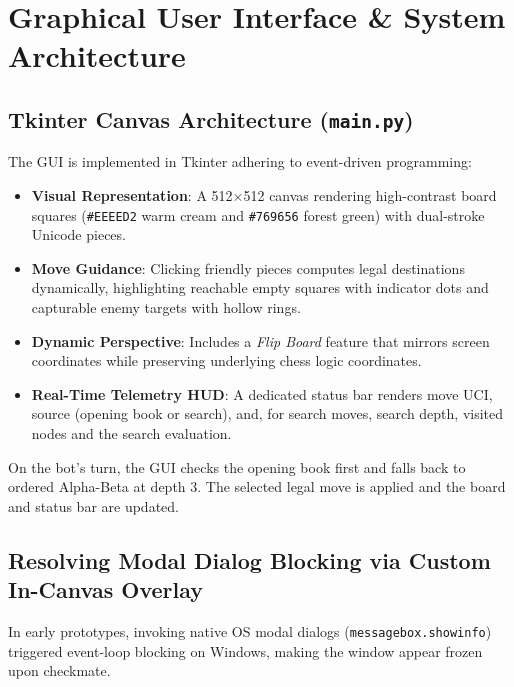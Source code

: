 \documentclass[11pt,a4paper]{article}
\begin{document}
\section{Graphical User Interface \& System Architecture}
\subsection{Tkinter Canvas Architecture (\texttt{main.py})}
The GUI is implemented in Tkinter adhering to event-driven programming:
\begin{itemize}[leftmargin=*]
    \item \textbf{Visual Representation}: A 512$\times$512 canvas rendering high-contrast board squares (\texttt{\#EEEED2} warm cream and \texttt{\#769656} forest green) with dual-stroke Unicode pieces.
    \item \textbf{Move Guidance}: Clicking friendly pieces computes legal destinations dynamically, highlighting reachable empty squares with indicator dots and capturable enemy targets with hollow rings.
    \item \textbf{Dynamic Perspective}: Includes a \textit{Flip Board} feature that mirrors screen coordinates while preserving underlying chess logic coordinates.
    \item \textbf{Real-Time Telemetry HUD}: A dedicated status bar renders move UCI, source (opening book or search), and, for search moves, search depth, visited nodes and the search evaluation.
\end{itemize}
On the bot's turn, the GUI checks the opening book first and falls back to ordered Alpha-Beta at depth 3. The selected legal move is applied and the board and status bar are updated.
\subsection{Resolving Modal Dialog Blocking via Custom In-Canvas Overlay}
In early prototypes, invoking native OS modal dialogs (\texttt{messagebox.showinfo}) triggered event-loop blocking on Windows, making the window appear frozen upon checkmate.
\end{document}
